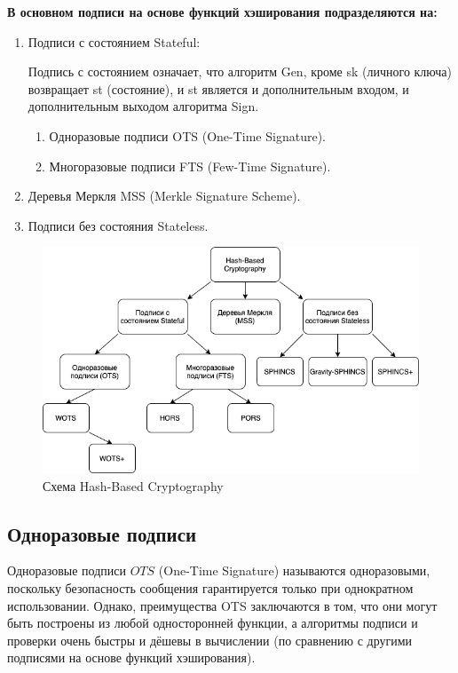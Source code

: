 \documentclass[a4paper, 14pt]{extarticle}
\begin{document}
\textbf{В основном подписи на основе функций хэширования подразделяются на:}

\begin{enumerate}
    \item Подписи с состоянием Stateful:

    Подпись с состоянием означает, что алгоритм Gen, кроме sk (личного ключа) возвращает st (состояние), и st является и дополнительным входом, и дополнительным выходом алгоритма Sign.

    \begin{enumerate}
        \item Одноразовые подписи OTS (One-Time Signature).
        \item Многоразовые подписи FTS (Few-Time Signature).
    \end{enumerate}
    
    \item Деревья Меркля MSS (Merkle Signature Scheme).

    \item Подписи без состояния Stateless.
\end{enumerate}

\begin{figure}[h]
    \centering
    \includegraphics[scale=0.75]{HBC_structure.png}
    \caption{Схема Hash-Based Cryptography}
    \label{fig:hbc_structure}
\end{figure}

\newpage

\subsection{Одноразовые подписи}
Одноразовые подписи $OTS$ (One-Time Signature) называются одноразовыми, поскольку безопасность сообщения гарантируется только при однократном использовании. Однако, преимущества OTS заключаются в том, что они могут быть построены из любой односторонней функции, а алгоритмы подписи и проверки очень быстры и дёшевы в вычислении (по сравнению с другими подписями на основе функций хэширования).
\end{document}
